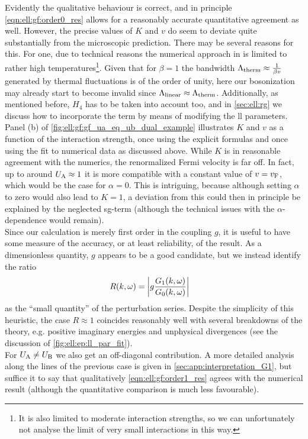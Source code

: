 Evidently the qualitative behaviour is correct, and in principle \autoref{eqn:ell:gf:order0_res} allows for a reasonably accurate quantitative agreement as well.
However, the precise values of $K$ and $v$ do seem to deviate quite substantially from the microscopic prediction. %
There may be several reasons for this.
For one, due to technical reasons the numerical approach in \cite{EP_DynamicInduced_Quenched_Lehmann_2021} is limited to rather high temperatures\footnote{It is also limited to moderate interaction strengths, so we can unfortunately not analyse the limit of very small interactions in this way.}.
Given that for $\beta=1$ the bandwidth $\Lambda_\ttherm \approx \frac{1}{\beta v}$ generated by thermal fluctuations is of the order of unity, here our bosonization may already start to become invalid since $\Lambda_\tlin \approx \Lambda_\ttherm$.
Additionally, as mentioned before, $H_4$ has to be taken into account too, and in \autoref{sec:ell:rg} we discuss how to incorporate the term by means of modifying the \gls{ll} parameters.\\
Panel (b) of \autoref{fig:ell:gf:gf_ua_eq_ub_dual_example} illustrates $K$ and $v$ as a function of the interaction strength, once using the explicit formulas and once using the fit to numerical data as discussed above.
While $K$ is in reasonable agreement with the numerics, the renormalized Fermi velocity is far off.
In fact, up to around $U_\A\approx 1$ it is more compatible with a constant value of $v=\vf$, which would be the case for $\alpha=0$.
This is intriguing, because although setting $\alpha$ to zero would also lead to $K=1$, a deviation from this could then in principle be explained by the neglected \gls{sg}-term (although the technical issues with the $\alpha$-dependence would remain).\\
Since our calculation is merely first order in the coupling $g$, it is useful to have some measure of the accuracy, or at least reliability, of the result.
As a dimensionless quantity, $g$ appears to be a good candidate, but we instead identify the ratio
\begin{align}
\PTR(k,\omega) &= \abs*{g\frac{G_1(k,\omega)}{G_0(k,\omega)}} \label{eqn:ell:gf:PTR_def}
\end{align}
as the ``small quantity'' of the perturbation series.
Despite the simplicity of this heuristic, the case $R\approx 1$ coincides reasonably well with several breakdowns of the theory, e.g. positive imaginary energies and unphysical divergences (see the discussion of \autoref{fig:ell:ep:ll_par_fit}).\\
For $U_\A\neq U_\B$ we also get an off-diagonal contribution.
A more detailed analysis along the lines of the previous case is given in \autoref{sec:app:interpretation_G1}, but suffice it to say that qualitatively \autoref{eqn:ell:gf:order1_res} agrees with the numerical result (although the quantitative comparison is much less favourable).
\FloatBarrier
